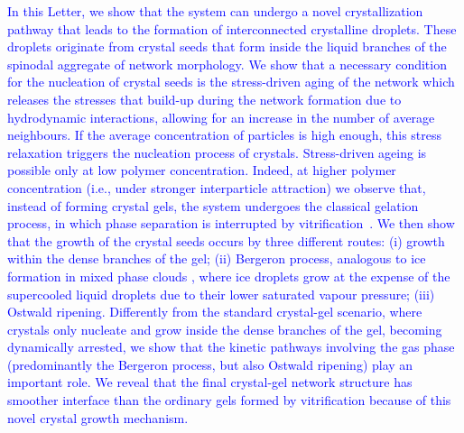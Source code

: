 \documentclass[preprint,amsmath,amssymb,superscriptaddress]{revtex4-1}
\begin{document}
\textcolor{blue}{
In this Letter, we show that the system can undergo a novel crystallization pathway that leads to the formation of interconnected crystalline droplets. 
These droplets originate from crystal seeds that form inside the liquid branches of the spinodal aggregate of network morphology.
We show that a necessary condition for the nucleation of crystal seeds is the stress-driven aging of the network which releases the stresses that build-up during the network formation due to hydrodynamic interactions, allowing for an increase in the number of average neighbours. 
If the average concentration of particles is high enough, this stress relaxation triggers the nucleation process of crystals. 
Stress-driven ageing is possible only at low polymer concentration. 
Indeed, at higher polymer concentration (i.e., under stronger interparticle attraction) we observe that, instead of forming crystal gels, the system undergoes the classical gelation process, in which
phase separation is interrupted by vitrification~\cite{verhaegh1997transient,tanaka1999colloid,Royall2007,lu2008gelation}.
We then show that the growth of the crystal seeds occurs by three different routes:
(i) growth within the dense branches of the gel;
(ii) Bergeron process, analogous to ice formation in mixed phase clouds \cite{glickman2000glossary,morrison2012resilience}, where ice droplets grow at the
expense of the supercooled liquid droplets due to their lower saturated vapour pressure;
(iii) Ostwald ripening.
Differently from the standard crystal-gel scenario, where crystals only nucleate and grow inside the dense branches of the gel, becoming dynamically arrested, we show that the kinetic pathways involving the gas phase (predominantly the Bergeron process, but also Ostwald ripening) play an important role.
We reveal that the final crystal-gel network structure has smoother interface than the ordinary gels formed by vitrification because of this novel crystal growth mechanism.
}
\end{document}
